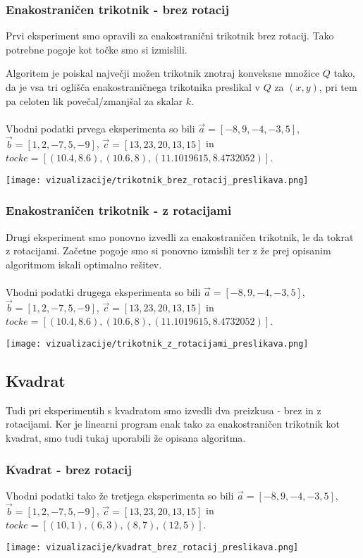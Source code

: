 \documentclass[a4paper, 12pt]{article}
\begin{document}
\subsubsection{Enakostraničen trikotnik - brez rotacij}
Prvi eksperiment smo opravili za enakostranični trikotnik brez rotacij. Tako potrebne pogoje kot točke smo si izmislili.
\newline

Algoritem je poiskal največji možen trikotnik znotraj konveksne množice $Q$ tako, da je vsa tri oglišča enakostraničnega trikotnika preslikal v $Q$ za $(x,y)$,
pri tem pa celoten lik povečal/zmanjšal za skalar $k$.
\\~\\
Vhodni podatki prvega eksperimenta so bili $\vec{a}=[-8,9,-4,-3,5]$, $\vec{b}=[1,2,-7,5,-9]$, $\vec{c}=[13,23,20,13,15]$ in $tocke = [(10.4,8.6),(10.6,8),(11.1019615,8.4732052)]$.
\begin{center}
    \texttt{[image: vizualizacije/trikotnik\_brez\_rotacij\_preslikava.png]}\\
\end{center}


\subsubsection{Enakostraničen trikotnik - z rotacijami}
Drugi eksperiment smo ponovno izvedli za enakostraničen trikotnik, le da tokrat z rotacijami. Začetne pogoje smo si ponovno izmislili ter z že prej opisanim algoritmom
iskali optimalno rešitev. 
\\~\\
Vhodni podatki drugega eksperimenta so bili $\vec{a}=[-8,9,-4,-3,5]$, $\vec{b}=[1,2,-7,5,-9]$, $\vec{c}=[13,23,20,13,15]$ in $tocke = [(10.4,8.6),(10.6,8),(11.1019615,8.4732052)]$.
\begin{center}
    \texttt{[image: vizualizacije/trikotnik\_z\_rotacijami\_preslikava.png]}\\
\end{center}

\subsection{Kvadrat}
Tudi pri eksperimentih s kvadratom smo izvedli dva preizkusa - brez in z rotacijami. Ker je linearni program enak tako za enakostraničen trikotnik kot kvadrat,
smo tudi tukaj uporabili že opisana algoritma.
 
\subsubsection{Kvadrat - brez rotacij}
Vhodni podatki tako že tretjega eksperimenta so bili $\vec{a}=[-8,9,-4,-3,5]$, $\vec{b}=[1,2,-7,5,-9]$, $\vec{c}=[13,23,20,13,15]$ in $tocke = [(10,1),(6,3), (8,7),(12,5)]$.
\begin{center}
    \texttt{[image: vizualizacije/kvadrat\_brez\_rotacij\_preslikava.png]}\\
\end{center}
\end{document}
